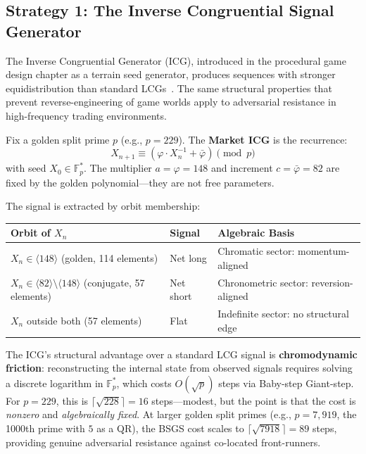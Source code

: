 \subsection{Strategy 1: The Inverse Congruential Signal Generator}

The Inverse Congruential Generator (ICG), introduced in the procedural game design chapter as a terrain seed generator, produces sequences with stronger equidistribution than standard LCGs~\cite{eichenauer1986non,niederreiter1992}. The same structural properties that prevent reverse-engineering of game worlds apply to adversarial resistance in high-frequency trading environments.

\begin{definition}\label{def:market_icg}
Fix a golden split prime $p$ (e.g., $p = 229$). The \textbf{Market ICG} is the recurrence:
\begin{equation}
    X_{n+1} \equiv (\varphi \cdot X_n^{-1} + \bar\varphi) \pmod{p}
\end{equation}
with seed $X_0 \in \mathbb{F}_p^*$. The multiplier $a = \varphi = 148$ and increment $c = \bar\varphi = 82$ are fixed by the golden polynomial---they are not free parameters.
\end{definition}

The signal is extracted by orbit membership:
\begin{center}\small
\begin{tabular}{@{}lll@{}}
\toprule
\textbf{Orbit of $X_n$} & \textbf{Signal} & \textbf{Algebraic Basis} \\
\midrule
$X_n \in \langle 148 \rangle$ (golden, 114 elements) & Net long & Chromatic sector: momentum-aligned \\
$X_n \in \langle 82 \rangle \setminus \langle 148 \rangle$ (conjugate, 57 elements) & Net short & Chronometric sector: reversion-aligned \\
$X_n$ outside both (57 elements) & Flat & Indefinite sector: no structural edge \\
\bottomrule
\end{tabular}
\end{center}

The ICG's structural advantage over a standard LCG signal is \textbf{chromodynamic friction}: reconstructing the internal state from observed signals requires solving a discrete logarithm in $\mathbb{F}_p^*$, which costs $O(\sqrt{p})$ steps via Baby-step Giant-step. For $p = 229$, this is $\lceil\sqrt{228}\rceil = 16$ steps---modest, but the point is that the cost is \emph{nonzero} and \emph{algebraically fixed}. At larger golden split primes (e.g., $p = 7{,}919$, the 1000th prime with $5$ as a QR), the BSGS cost scales to $\lceil\sqrt{7918}\rceil = 89$ steps, providing genuine adversarial resistance against co-located front-runners.

